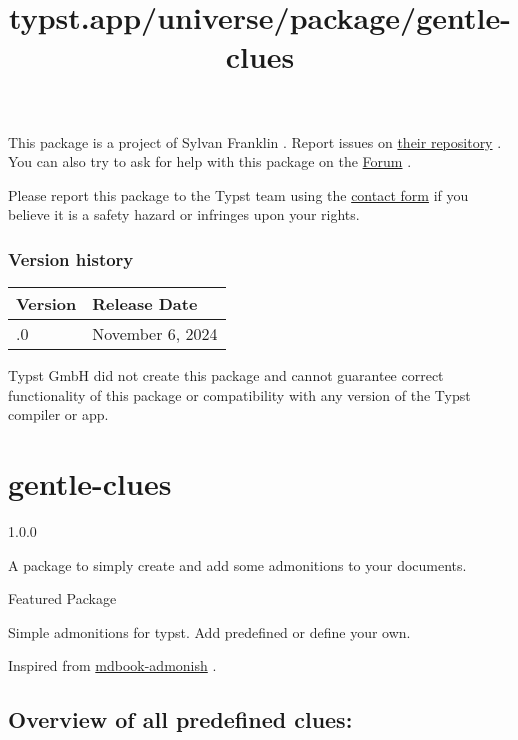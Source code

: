 This package is a project of Sylvan Franklin . Report issues on
\href{https://github.com/sylvanfranklin/tinyset}{their repository} . You
can also try to ask for help with this package on the
\href{https://forum.typst.app}{Forum} .

Please report this package to the Typst team using the
\href{https://typst.app/contact}{contact form} if you believe it is a
safety hazard or infringes upon your rights.

\label{versions}
\subsubsection{Version history}\label{version-history}

\begin{longtable}[]{@{}ll@{}}
\toprule\noalign{}
Version & Release Date \\
\midrule\noalign{}
\endhead
\bottomrule\noalign{}
\endlastfoot
0.1.0 & November 6, 2024 \\
\end{longtable}

Typst GmbH did not create this package and cannot guarantee correct
functionality of this package or compatibility with any version of the
Typst compiler or app.


\title{typst.app/universe/package/gentle-clues}

\label{banner}
\section{gentle-clues}\label{gentle-clues}

{ 1.0.0 }

A package to simply create and add some admonitions to your documents.

{ } Featured Package

\label{readme}
Simple admonitions for typst. Add predefined or define your own.

Inspired from
\href{https://tommilligan.github.io/mdbook-admonish/}{mdbook-admonish} .

\subsection{Overview of all predefined
clues:}\label{overview-of-all-predefined-clues}

\pandocbounded{}

